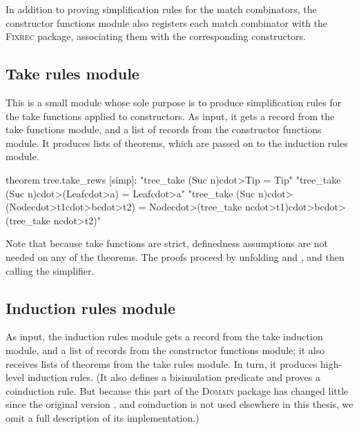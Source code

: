 In addition to proving simplification rules for the match combinators, the constructor functions module also registers each match combinator with the \textsc{Fixrec} package, associating them with the corresponding constructors.

\subsection{Take rules module}

This is a small module whose sole purpose is to produce simplification rules for the take functions applied to constructors. As input, it gets a  record from the take functions module, and a list of  records from the constructor functions module. It produces lists of  theorems, which are passed on to the induction rules module.
%
\begin{isacode}
theorem tree.take_rews [simp]:
  "tree_take (Suc n)\<cdot>Tip = Tip"
  "tree_take (Suc n)\<cdot>(Leaf\<cdot>a) = Leaf\<cdot>a"
  "tree_take (Suc n)\<cdot>(Node\<cdot>t1\<cdot>b\<cdot>t2) = Node\<cdot>(tree_take n\<cdot>t1)\<cdot>b\<cdot>(tree_take n\<cdot>t2)"
\end{isacode}
%
Note that because take functions are strict, definedness assumptions are not needed on any of the  theorems. The proofs proceed by unfolding  and , and then calling the simplifier.

\subsection{Induction rules module}

As input, the induction rules module gets a  record from the take induction module, and a list of  records from the constructor functions module; it also receives lists of  theorems from the take rules module. In turn, it produces high-level induction rules. (It also defines a bisimulation predicate and proves a coinduction rule. But because this part of the \textsc{Domain} package has changed little since the original version \cite{Oheimb97, hol+lcf}, and coinduction is not used elsewhere in this thesis, we omit a full description of its implementation.)

